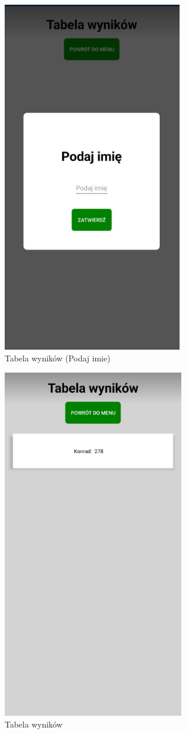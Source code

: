 	\begin{figure}[!htb]
	\begin{center}
		\includegraphics[width=8cm]{rys/opis13.png}
		\caption{Tabela wyników (Podaj imie)}
		\label{rys:rysunek001}
	\end{center}
\end{figure}

	\begin{figure}[!htb]
	\begin{center}
		\includegraphics[width=8cm]{rys/opis14.png}
		\caption{Tabela wyników}
		\label{rys:rysunek001}
	\end{center}
\end{figure}
